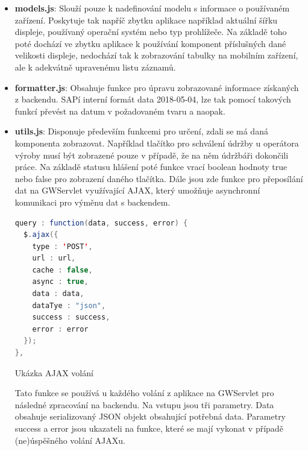 \documentclass[thesis=M,czech]{FITthesis}[2012/06/26]
\begin{document}
\begin{itemize}
	\begin{itemize}
		\item
		\textbf{models.js}: Slouží pouze k nadefinování modelu s informace o používaném zařízení. Poskytuje tak napříč zbytku aplikace například aktuální šířku displeje, používaný operační systém nebo typ prohlížeče. Na základě toho poté dochází ve zbytku aplikace k používání komponent příslušných dané velikosti displeje, nedochází tak k zobrazování tabulky na mobilním zařízení, ale k adekvátně upravenému listu záznamů.
		\item
		\textbf{formatter.js}: Obsahuje funkce pro úpravu zobrazované informace získaných z backendu. SAPí interní formát data 2018-05-04, lze tak pomocí takových funkcí převést na datum v požadovaném tvaru a naopak.
		\item
		\textbf{utils.js}: \label{file:utils.js} Disponuje především funkcemi pro určení, zdali se má daná komponenta zobrazovat. Například tlačítko pro schválení údržby u operátora výroby musí být zobrazené pouze v případě, že na něm údržbáři dokončili práce. Na základě statusu hlášení poté funkce vrací boolean hodnoty true nebo false pro zobrazení daného tlačítka. Dále jsou zde funkce pro přeposílání dat na GWServlet využívající AJAX, který umožňuje asynchronní komunikaci pro výměnu dat s backendem. 
		\begin{algorithm}[H]
			\begin{lstlisting}[language=java]      
query : function(data, success, error) {
  $.ajax({
    type : 'POST',
    url : url,
    cache : false,
    async : true,
    data : data,
    dataTye : "json",
    success : success,
    error : error
  });
},
			\end{lstlisting}
			\caption{Ukázka AJAX volání}	
			\label{code:ajax}
			\small Tato funkce se používá u každého volání z aplikace na GWServlet pro následné zpracování na backendu. Na vstupu jsou tři parametry. Data obsahuje serializovaný JSON objekt obsahující potřebná data. Parametry success a error jsou ukazateli na funkce, které se mají vykonat v případě (ne)úspěšného volání AJAXu. 
		\end{algorithm}	
		
		
	\end{itemize} 
\end{itemize} 
\end{document}
